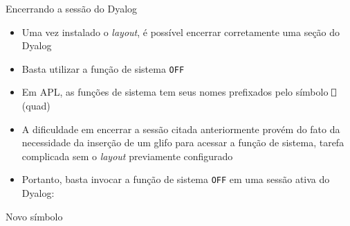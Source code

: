 \begin{frame}[fragile]{Encerrando a sessão do Dyalog}

    \begin{itemize}
        \item Uma vez instalado o \textit{layout}, é possível encerrar corretamente uma seção do Dyalog
        \pause

        \item Basta utilizar a função de sistema \texttt{OFF}
        \pause

        \item Em APL, as funções de sistema tem seus nomes prefixados pelo símbolo \texttt{⎕} (quad)
        \pause

        \item A dificuldade em encerrar a sessão citada anteriormente provém do fato da necessidade
            da inserção de um glifo para acessar a função de sistema, tarefa complicada sem o
            \textit{layout} previamente configurado

        \pause

        \item Portanto, basta invocar a função de sistema \texttt{OFF} em uma sessão ativa do Dyalog:


    \end{itemize}

\end{frame}

\begin{frame}[fragile]{Novo símbolo}


\end{frame}


